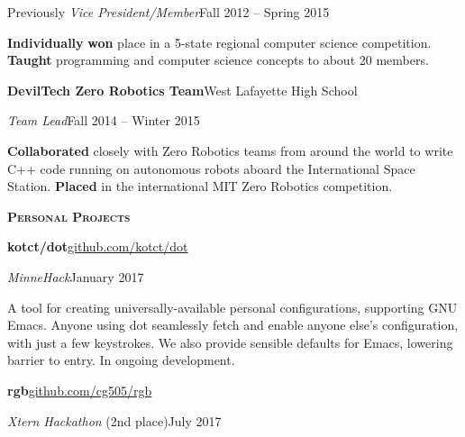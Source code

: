 \documentclass[11pt]{article}
\newcommand{\sectionfont}{\Large\scshape\bfseries\color{cg505green}}
\newcommand{\impact}[1]{\textcolor{cg505green}{\nohyphens{#1}}}
\begin{document}
\begin{minipage}[t]{0.67\textwidth}
\begin{adjustwidth}{10pt}{}
    Previously \emph{Vice President/Member}\hfill Fall 2012 -- Spring 2015

    \textbf{Individually} \impact{\textbf{won}  place} in a 5-state regional computer science competition.
    \textbf{Taught} programming and computer science concepts to about 20 members.
  \end{adjustwidth}

  \textbf{DevilTech Zero Robotics Team}\hfill West Lafayette High School
  \begin{adjustwidth}{10pt}{}
    \emph{Team Lead}\hfill Fall 2014 -- Winter 2015

    \textbf{Collaborated} closely with Zero Robotics teams from \impact{around the world} to write C++ code running on autonomous robots aboard the International Space Station.
    \impact{\textbf{Placed} } in the international MIT Zero Robotics competition.
  \end{adjustwidth}



  \vspace{10pt}

  {\sectionfont Personal Projects}

  \textbf{kotct/dot}\hfill\href{https://github.com/kotct/dot/}{github.com/kotct/dot}
  \begin{adjustwidth}{10pt}{}
    \emph{MinneHack}\hfill January 2017

    A tool for creating universally-available personal configurations, supporting GNU Emacs.
    Anyone using dot seamlessly fetch and enable anyone else's configuration, with just a few keystrokes.
    We also provide sensible defaults for Emacs, lowering barrier to entry.
    In ongoing development.
  \end{adjustwidth}

  \textbf{rgb}\hfill\href{https://github.com/cg505/rgb/}{github.com/cg505/rgb}
  \begin{adjustwidth}{10pt}{}
    \emph{Xtern Hackathon} (2nd place)\hfill July 2017


\end{adjustwidth}
\end{minipage}
\end{document}
